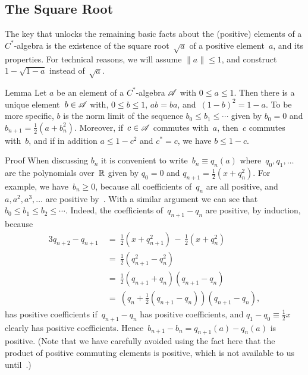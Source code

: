 \documentclass[a]{subfiles}
\begin{document}
\subsection{The Square Root}
\begin{parsec}%
\begin{point}%
The key that unlocks the remaining basic facts 
about the (positive) elements of a  $C^*$-algebra
is the existence of the square root~$\sqrt{a}$ of a positive element~$a$,
and its properties.
For technical reasons,
we will assume $\|a\|\leq 1$,
and construct
 $1-\sqrt{1-a}$ instead of~$\sqrt{a}$.
\end{point}
\begin{point}{Lemma}%
Let $a$ be an element of a $C^*$-algebra $\mathscr{A}$
with $0\leq a\leq 1$.
Then there is a unique element~$b\in\mathscr{A}$ 
with, $0\leq b\leq 1$,
$ab=ba$,
and~$(1-b)^2 = 1-a$.
To be more specific,
$b$ is the norm limit of
the sequence $b_0\leq b_1\leq \dotsb$
given by $b_0=0$ and $b_{n+1} = \frac{1}{2}(a+b_n^2)$.
Moreover,
if~$c\in\mathscr{A}$ commutes with~$a$, then~$c$ commutes with~$b$,
and if in addition $a\leq 1-c^2$ and $c^*=c$,
we have $b\leq 1-c$.
\begin{point}{Proof}%
When discussing $b_n$ it 
is convenient to write~$b_n \equiv q_n(a)$
where~$q_0,q_1,\dotsc$ are the polynomials over~$\mathbb{R}$ given by
$q_0=0$ and $q_{n+1}=\frac{1}{2}(x + q_n^2)$.
For example,
we have~$b_n\geq 0$, 
because all coefficients of~$q_n$ are all positive,
and $a,a^2,a^3,\dotsc$ are positive by~.
With a similar argument we can see that
 $b_0 \leq b_1\leq b_2\leq \dotsb$.
Indeed, 
the coefficients of~$q_{n+1}-q_n$
are positive,
by induction,
because
\begin{alignat*}{3}
q_{n+2}-q_{n+1} \ &=\ \textstyle \frac{1}{2}(x+ q_{n+1}^2)
\,-\, \textstyle\frac{1}{2}(x+q_n^2) \\
&=\ \textstyle\frac{1}{2}(q_{n+1}^2- q_n^2) \\
&=\ \textstyle\frac{1}{2}(q_{n+1}+q_n)(q_{n+1}-q_n) \\
&=\ (q_n+\textstyle\frac{1}{2}(q_{n+1}-q_n))(q_{n+1}-q_n),
\end{alignat*}
has positive coefficients
if~$q_{n+1}-q_n$ has positive coefficients,
and $q_1-q_0\equiv \frac{1}{2}x$ clearly has positive coefficients.
Hence~$b_{n+1}-b_{n} = q_{n+1}(a)- q_n(a)$ is positive.
(Note that we have carefully avoided
using the fact here that the product of positive 
commuting elements is positive,
which is not available to us until~.)


\end{point}
\end{point}
\end{parsec}
\end{document}
